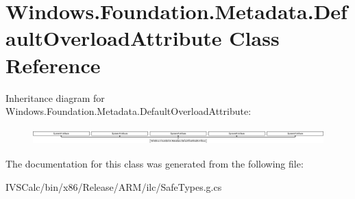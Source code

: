 \hypertarget{class_windows_1_1_foundation_1_1_metadata_1_1_default_overload_attribute}{}\section{Windows.\+Foundation.\+Metadata.\+Default\+Overload\+Attribute Class Reference}
\label{class_windows_1_1_foundation_1_1_metadata_1_1_default_overload_attribute}
Inheritance diagram for Windows.\+Foundation.\+Metadata.\+Default\+Overload\+Attribute\+:\begin{figure}[H]
\begin{center}
\leavevmode
\includegraphics[height=0.664688cm]{class_windows_1_1_foundation_1_1_metadata_1_1_default_overload_attribute}
\end{center}
\end{figure}


The documentation for this class was generated from the following file\+:\begin{DoxyCompactItemize}
\item 
I\+V\+S\+Calc/bin/x86/\+Release/\+A\+R\+M/ilc/Safe\+Types.\+g.\+cs\end{DoxyCompactItemize}
